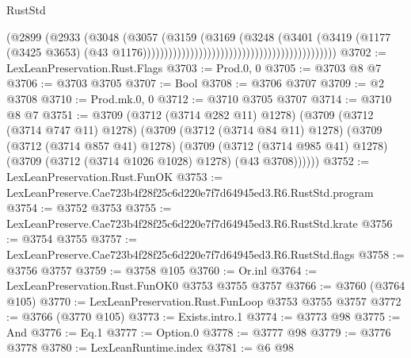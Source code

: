 \begin{lexlean}{RustStd}
\begin{coremodule}
                                                                        (@2899
                                                                          (@2933
                                                                            (@3048
                                                                              (@3057
                                                                                (@3159
                                                                                  (@3169
                                                                                    (@3248
                                                                                      (@3401
                                                                                        (@3419
                                                                                          (@1177
                                                                                            (@3425
                                                                                              @3653)
                                                                                            (@43
                                                                                              @1176)))))))))))))))))))))))))))))))))))))))))))))
@3702 := LexLeanPreservation.Rust.Flags
@3703 := Prod.{0, 0}
@3705 := @3703 @8 @7
@3706 := @3703 @3705
@3707 := Bool
@3708 := @3706 @3707
@3709 := @2 @3708
@3710 := Prod.mk.{0, 0}
@3712 := @3710 @3705 @3707
@3714 := @3710 @8 @7
@3751 := @3709
    (@3712 (@3714 @282 @11) @1278)
    (@3709
      (@3712 (@3714 @747 @11) @1278)
      (@3709
        (@3712 (@3714 @84 @11) @1278)
        (@3709
          (@3712 (@3714 @857 @41) @1278)
          (@3709
            (@3712 (@3714 @985 @41) @1278)
            (@3709 (@3712 (@3714 @1026 @1028) @1278) (@43 @3708))))))
@3752 := LexLeanPreservation.Rust.FunOK
@3753 := LexLeanPreserve.Cae723b4f28f25c6d220e7f7d64945ed3.R6.RustStd.program
@3754 := @3752 @3753
@3755 := LexLeanPreserve.Cae723b4f28f25c6d220e7f7d64945ed3.R6.RustStd.krate
@3756 := @3754 @3755
@3757 := LexLeanPreserve.Cae723b4f28f25c6d220e7f7d64945ed3.R6.RustStd.flags
@3758 := @3756 @3757
@3759 := @3758 @105
@3760 := Or.inl
@3764 := LexLeanPreservation.Rust.FunOK0 @3753 @3755 @3757
@3766 := @3760 (@3764 @105)
@3770 := LexLeanPreservation.Rust.FunLoop @3753 @3755 @3757
@3772 := @3766 (@3770 @105)
@3773 := Exists.intro.{1}
@3774 := @3773 @98
@3775 := And
@3776 := Eq.{1}
@3777 := Option.{0}
@3778 := @3777 @98
@3779 := @3776 @3778
@3780 := LexLeanRuntime.index
@3781 := @6 @98

\end{coremodule}
\end{lexlean}
